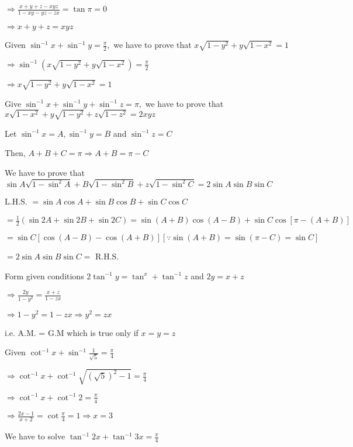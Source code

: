   $\Rightarrow \frac{x + y + z - xyz}{1 - xy - yz - zx} = \tan \pi = 0$

  $\Rightarrow x + y + z = xyz$

\item Given $\sin^{-1}x + \sin^{-1}y = \frac{\pi}{2},$ we have to prove that $x\sqrt{1 - y^2} + y\sqrt{1 - x^2} = 1$

  $\Rightarrow \sin^{-1}(x\sqrt{1 - y^2} + y\sqrt{1 - x^2}) = \frac{\pi}{2}$

  $\Rightarrow x\sqrt{1 - y^2} + y\sqrt{1 - x^2} = 1$

\item Give $\sin^{-1}x + \sin^{-1}y + \sin^{-1}z = \pi,$ we have to prove that $x\sqrt{1 - x^2} + y\sqrt{1 - y^2} +
  z\sqrt{1 - z^2} = 2xyz$

  Let $\sin^{-1}x = A, \sin^{-1}y = B$ and $\sin^{-1}z = C$

  Then, $A + B + C = \pi \Rightarrow A + B = \pi - C$

  We have to prove that $\sin A\sqrt{1 - \sin^2A} + B\sqrt{1 - \sin^2B} + z\sqrt{1 - \sin^2C} = 2\sin A\sin B\sin C$

  L.H.S. $= \sin A\cos A + \sin B\cos B + \sin C\cos C$

  $= \frac{1}{2}(\sin 2A + \sin 2B + \sin 2C) = \sin(A + B)\cos(A - B) + \sin C\cos[\pi - (A + B)]$

  $= \sin C[\cos(A - B) - \cos(A + B)][\because \sin(A + B) = \sin(\pi - C) = \sin C]$

  $= 2\sin A\sin B \sin C =$ R.H.S.

\item Form given conditions $2\tan^{-1}y = \tan^{x} + \tan^{-1}z$ and $2y = x + z$

  $\Rightarrow \frac{2y}{1 - y^2} = \frac{x + z}{1 - zx}$

  $\Rightarrow 1 - y^2 = 1 - zx \Rightarrow y^2 = zx$

  i.e. A.M. = G.M which is true only if $x = y = z$

\item Given $\cot^{-1}x + \sin^{-1}\frac{1}{\sqrt{5}} = \frac{\pi}{4}$

  $\Rightarrow \cot^{-1}x + \cot^{-1}\sqrt{(\sqrt{5})^2 - 1} = \frac{\pi}{4}$

  $\Rightarrow \cot^{-1}x + \cot^{-1}2 = \frac{\pi}{4}$

  $\Rightarrow \frac{2x - 1}{x + 2} = \cot\frac{\pi}{4} = 1 \Rightarrow x = 3$

\item We have to solve $\tan^{-1}2x + \tan^{-1}3x = \frac{\pi}{4}$

